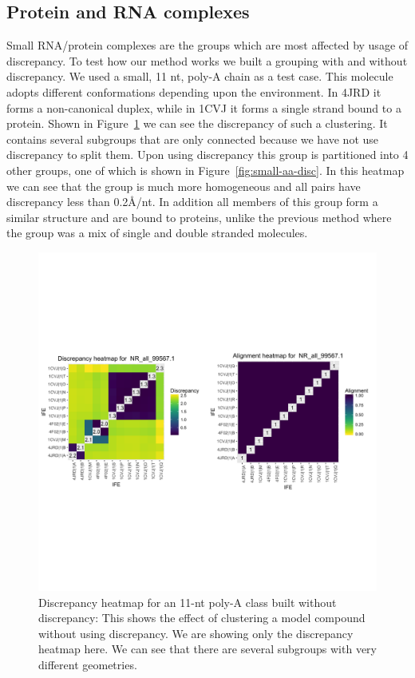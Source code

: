 \subsection{Protein and RNA complexes}

Small RNA/protein complexes are the groups which are most affected by usage of
discrepancy. To test how our method works we built a grouping with and without
discrepancy. We used a small, 11 nt, poly-A chain as a test case. This molecule
adopts different conformations depending upon the environment. In 4JRD it forms
a non-canonical duplex, while in 1CVJ it forms a single strand bound to a
protein. Shown in Figure~\ref{fig:small-aa-no-disc} we can see the discrepancy
of such a clustering. It contains several subgroups that are only connected
because we have not use discrepancy to split them. Upon using discrepancy this
group is partitioned into 4 other groups, one of which is shown in
Figure~\ref{fig:small-aa-disc}.  In this heatmap we can see that the group is
much more homogeneous and all pairs have discrepancy less than 0.2{\AA}/nt. In
addition all members of this group form a similar structure and are bound to
proteins, unlike the previous method where the group was a mix of single and
double stranded molecules.

\begin{figure}[h]
  \includegraphics[width=\textwidth]{chapter-3/figs/small-aa-no-disc}
  \caption{Discrepancy heatmap for an 11-nt poly-A class built without
    discrepancy: This shows the effect of clustering a model compound without
    using discrepancy. We are showing only the discrepancy heatmap here. We can
  see that there are several subgroups with very different geometries.}
  \label{fig:small-aa-no-disc}
\end{figure}

